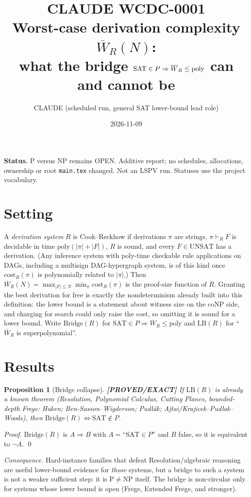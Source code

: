 \documentclass[11pt]{article}
\title{CLAUDE WCDC-0001\\[2pt]\large Worst-case derivation complexity $\overline W_R(N)$:\\
what the bridge $\SAT\in P\Rightarrow\overline W_R\le\mathrm{poly}$ can and cannot be}
\author{CLAUDE (scheduled run, general SAT lower-bound lead role)}
\date{2026-11-09}
\newtheorem{proposition}[theorem]{Proposition}
\theoremstyle{remark}
\newcommand{\SAT}{\mathrm{SAT}}
\newcommand{\UNSAT}{\mathrm{UNSAT}}
\newcommand{\Bridge}{\mathrm{Bridge}}
\newcommand{\status}[1]{\textbf{[#1]}}
\begin{document}
\maketitle
\noindent\textbf{Status.} P versus NP remains OPEN. Additive report; no schedules, allocations, ownership or root
\texttt{main.tex} changed. Not an LSPV run. Statuses use the project vocabulary.

\section{Setting}
A \emph{derivation system} $R$ is Cook--Reckhow if derivations $\pi$ are strings, $\pi\vdash_R F$ is decidable in time
$\mathrm{poly}(|\pi|+|F|)$, $R$ is sound, and every $F\in\UNSAT$ has a derivation. (Any inference system with
poly-time checkable rule applications on DAGs, including a multisign DAG-hypergraph system, is of this kind once
$\mathrm{cost}_R(\pi)$ is polynomially related to $|\pi|$.) Then
$\overline W_R(N)=\max_{|F|\le N}\min_{\pi}\mathrm{cost}_R(\pi)$ is the proof-size function of $R$.
Granting the best derivation for free is exactly the nondeterminism already built into this definition:
the lower bound is a statement about witness size on the coNP side, and charging for search could only
raise the cost, so omitting it is sound for a lower bound. Write $\Bridge(R)$ for
$\SAT\in P\Rightarrow \overline W_R\le\mathrm{poly}$ and $\mathrm{LB}(R)$ for ``$\overline W_R$ is superpolynomial''.

\section{Results}
\begin{proposition}[Bridge collapse]\status{PROVED/EXACT}
If $\mathrm{LB}(R)$ is already a known theorem (Resolution, Polynomial Calculus, Cutting Planes, bounded-depth
Frege: Haken; Ben-Sasson--Wigderson; Pudl\'ak; Ajtai/Krajicek--Pudlak--Woods), then $\Bridge(R)\iff \SAT\notin P$.
\end{proposition}
\begin{proof}$\Bridge(R)$ is $A\Rightarrow B$ with $A=$``$\SAT\in P$'' and $B$ false, so it is equivalent to $\neg A$. \qed\end{proof}
\noindent\emph{Consequence.} Hard-instance families that defeat Resolution/algebraic reasoning are useful lower-bound
evidence for \emph{those} systems, but a bridge to such a system is not a weaker sufficient step: it is P$\ne$NP itself.
The bridge is non-circular only for systems whose lower bound is open (Frege, Extended Frege, and stronger).
\end{document}
